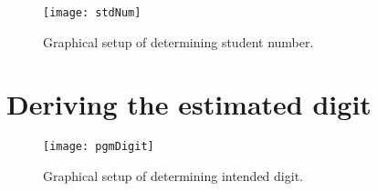 \begin{figure}
  \centering
  \texttt{[image: stdNum]}\\
  \caption{Graphical setup of determining student number.}
  \label{fig:stdNum}
\end{figure}

\section{Deriving the estimated digit}
\label{sec:digit}



\begin{figure}
  \centering
  \texttt{[image: pgmDigit]}\\
  \caption{Graphical setup of determining intended digit.}
  \label{fig:pgmDigit2}
\end{figure}
